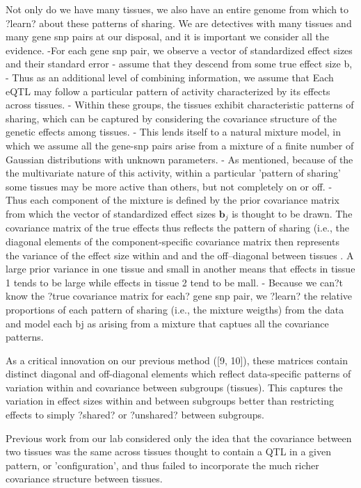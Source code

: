 \documentclass[10pt,letterpaper]{article}
\begin{document}
Not only do we have many tissues, we also have an entire genome from which to ?learn? about these patterns of sharing.  We are detectives with many tissues and many gene snp pairs at our disposal, and it is important we consider all the evidence.
-For each gene snp pair, we observe a vector of standardized effect sizes and their standard error
- assume that they descend from some true effect size b,
- Thus as an additional level of combining information, we assume that Each eQTL may follow a particular pattern of activity characterized by its effects across tissues.
- Within these groups, the tissues exhibit characteristic patterns of sharing, which can be captured by considering the covariance structure of the genetic effects among tissues. 
- This lends itself to a natural mixture model, in which  we assume all the gene-snp pairs arise from a mixture of a finite number of Gaussian distributions with unknown parameters. 
- As mentioned, because of the the multivariate nature of this activity, within a particular 'pattern of sharing' some tissues may be more active than others, but not completely on or off. 
- Thus each component of the mixture is defined by the prior covariance matrix from which the vector of standardized effect sizes $\bm{b}_{j}$ is thought to be drawn. The covariance matrix of the true effects thus reflects the pattern of sharing 
(i.e., the diagonal elements of the component-specific covariance matrix then represents the variance of the effect size within and and the off--diagonal between tissues . A large prior variance in one tissue and small in another means that effects in tissue 1 tends to be large while effects in tissue 2 tend to be mall.
- Because we can?t know the ?true covariance matrix for each? gene snp pair, we ?learn? the relative proportions of each pattern of sharing (i.e., the mixture weigths) from the data and model each bj as arising from a mixture that captues all the covariance patterns.


As a critical innovation on our previous method ([9, 10]), these matrices contain distinct diagonal and off-diagonal elements which reflect data-specific patterns of variation within and covariance between subgroups (tissues). This captures the variation in effect sizes within and between subgroups better than restricting effects to simply ?shared? or ?unshared? between subgroups. 

Previous work from our lab considered only the idea that the covariance between two tissues was the same across tissues thought to contain a QTL in a given pattern, or 'configuration',  and thus failed to incorporate the much richer covariance structure between tissues. 
\end{document}
